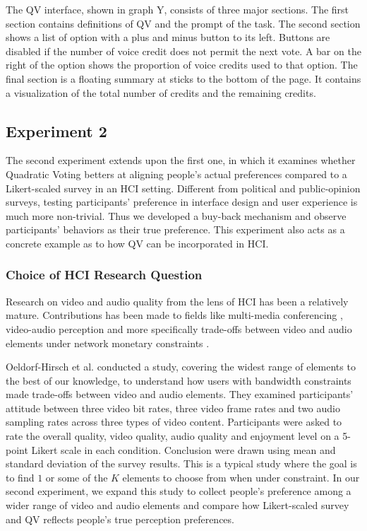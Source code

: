 The QV interface, 
shown in graph Y, 
consists of three major sections.
The first section contains definitions of QV and the prompt of the task.
The second section shows a list of option with a plus and minus button to its left.
Buttons are disabled if the number of voice credit does not permit the next vote.
A bar on the right of the option shows the proportion of voice credits used to that option.
The final section is a floating summary at sticks to the bottom of the page.
It contains a visualization of the total number of credits and the remaining credits.\par

\subsection{Experiment 2}
The second experiment extends upon the first one,
in which it examines 
whether Quadratic Voting betters at aligning people's actual preferences
compared to a Likert-scaled survey in an HCI setting.
Different from political and public-opinion surveys, 
testing participants' preference 
in interface design and user experience 
is much more non-trivial.
Thus we developed a buy-back mechanism 
and observe participants' behaviors 
as their true preference.
This experiment also acts as a concrete example as to how QV can be incorporated in HCI.

\subsubsection{Choice of HCI Research Question}
Research on video and audio quality 
from the lens of HCI 
has been a relatively mature.
Contributions has been made to fields like
multi-media conferencing \cite{watson1996evaluating}, video-audio perception \cite{chen2006cognitive, molnar2015assessing}
and more specifically trade-offs between video and audio elements under network monetary constraints \cite{molnar2013comedy, oeldorf2012bad}.

Oeldorf-Hirsch et al. \cite{oeldorf2012bad} conducted a study, 
covering the widest range of elements to the best of our knowledge,
to understand how users with bandwidth constraints 
made trade-offs between video and audio elements. 
They examined participants' attitude between three video bit rates, 
three video frame rates and two audio sampling rates 
across three types of video content.
Participants were asked to rate the overall quality, 
video quality, audio quality and enjoyment level 
on a 5-point Likert scale in each condition. 
Conclusion were drawn using mean and standard deviation of the survey results.
This is a typical study 
where the goal is to find  
$1$ or some of the $K$ elements to choose from
when under constraint.
In our second experiment, we expand this study
to collect people's preference among a wider range of video and audio elements 
and compare how Likert-scaled survey and QV reflects people's true perception preferences. 

